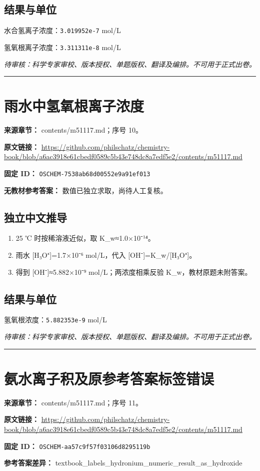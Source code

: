 \documentclass[UTF8,11pt,oneside,openany,fontset=none]{ctexbook}
\begin{document}
\subsection*{结果与单位}
\noindent 水合氢离子浓度：\texttt{3.019952e-7} mol/L\par
\noindent 氢氧根离子浓度：\texttt{3.311311e-8} mol/L\par
\noindent\textit{待审核：科学专家审校、版本授权、单题版权、翻译及编排。不可用于正式出卷。}
\medskip\hrule\medskip
\section{雨水中氢氧根离子浓度}
\noindent\textbf{来源章节：} contents/m51117.md；序号 10。\par
\noindent\textbf{原文链接：} \url{https://github.com/philschatz/chemistry-book/blob/a6ac3918e61cbedf0589c5b43e748dc8a7edf5e2/contents/m51117.md}\par
\noindent\textbf{固定 ID：} \texttt{OSCHEM-7538ab68d00552e9a91ef013}\par
\textbf{无教材参考答案：} 数值已独立求取，尚待人工复核。\par
\subsection*{独立中文推导}
\begin{enumerate}
\item 25 ℃ 时按稀溶液近似，取 K\_w≈1.0×10⁻¹⁴。
\item 雨水 [H₃O⁺]=1.7×10⁻⁶ mol/L，代入 [OH⁻]=K\_w/[H₃O⁺]。
\item 得到 [OH⁻]≈5.882×10⁻⁹ mol/L；两浓度相乘反验 K\_w，教材原题未附答案。
\end{enumerate}
\subsection*{结果与单位}
\noindent 氢氧根浓度：\texttt{5.882353e-9} mol/L\par
\noindent\textit{待审核：科学专家审校、版本授权、单题版权、翻译及编排。不可用于正式出卷。}
\medskip\hrule\medskip
\section{氨水离子积及原参考答案标签错误}
\noindent\textbf{来源章节：} contents/m51117.md；序号 11。\par
\noindent\textbf{原文链接：} \url{https://github.com/philschatz/chemistry-book/blob/a6ac3918e61cbedf0589c5b43e748dc8a7edf5e2/contents/m51117.md}\par
\noindent\textbf{固定 ID：} \texttt{OSCHEM-aa57c9f57f03106d8295119b}\par
\textbf{参考答案差异：} textbook\_labels\_hydronium\_numeric\_result\_as\_hydroxide\par
\end{document}
